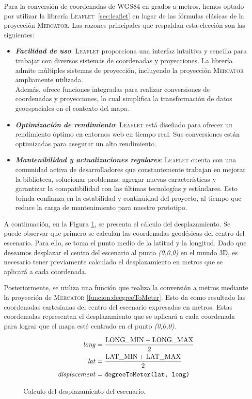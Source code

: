 \documentclass[a4paper, 11pt]{book}
\begin{document}
Para la conversión de coordenadas de \textsc{WGS84} en grados a metros, hemos optado por utilizar la librería \textsc{Leaflet}~\ref{sec:leaflet} en lugar de las fórmulas clásicas de la proyección \textsc{Mercator}. Las razones principales que respaldan esta elección son las siguientes:
\begin{itemize}
    \item \textbf{\emph{Facilidad de uso}}: \textsc{Leaflet} proporciona una interfaz intuitiva y sencilla para trabajar con diversos sistemas de coordenadas y proyecciones. La librería admite múltiples sistemas de proyección, incluyendo la proyección \textsc{Mercator} ampliamente utilizada.\\ 
    Además, ofrece funciones integradas para realizar conversiones de coordenadas y proyecciones, lo cual simplifica la transformación de datos geoespaciales en el contexto del mapa.
    \item \textbf{\emph{Optimización de rendimiento}}: \textsc{Leaflet} está diseñado para ofrecer un rendimiento óptimo en entornos web en tiempo real. Sus conversiones están optimizadas para asegurar un alto rendimiento.
    \item \textbf{\emph{Mantenibilidad y actualizaciones regulares}}: \textsc{Leaflet} cuenta con una comunidad activa de desarrolladores que constantemente trabajan en mejorar la biblioteca, solucionar problemas, agregar nuevas características y garantizar la compatibilidad con las últimas tecnologías y estándares. Esto brinda confianza en la estabilidad y continuidad del proyecto, al tiempo que reduce la carga de mantenimiento para nuestro prototipo.
\end{itemize}
A continuación, en la Figura \ref{formula:desplazamiento}, se presenta el cálculo del desplazamiento. Se puede observar que primero se calculan las coordenadas geodésicas del centro del escenario. Para ello, se toma el punto medio de la latitud y la longitud. Dado que deseamos desplazar el centro del escenario al punto \emph{(0,0,0)} en el mundo \textsc{3D}, es necesario tener previamente calculado el desplazamiento en metros que se aplicará a cada coordenada.

Posteriormente, se utiliza una función que realiza la conversión a metros mediante la proyección de \textsc{Mercator} \ref{funcion:deegreeToMeter}. Esto da como resultado las coordenadas cartesianas del centro del escenario expresadas en metros. Estas coordenadas representan el desplazamiento que se aplicará a cada coordenada para lograr que el mapa esté centrado en el punto \emph{(0,0,0)}.
\begin{figure}[h]
\begin{align*}
\text{\emph{long}} &= \frac{{\text{LONG\_MIN} + \text{LONG\_MAX}}}{2} \\
\text{\emph{lat}} &= \frac{{\text{LAT\_MIN} + \text{LAT\_MAX}}}{2} \\
\text{\emph{displacement}} &= \texttt{\text{degreeToMeter}(\text{lat}, \text{long})}
\end{align*}
\caption{Calculo del desplazamiento del escenario.}
  \label{formula:desplazamiento}
\end{figure}
\end{document}
